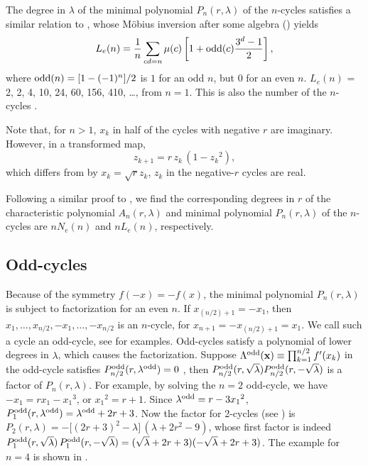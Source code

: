 \documentclass[twocolumn]{revtex4-1}
\begin{document}
The degree in $\lambda$ of
the minimal polynomial $P_n(r, \lambda)$ of the $n$-cycles
satisfies a similar relation to ,
%
whose M\"obius inversion
after some algebra () yields
\begin{equation}
  L_e(n) = \frac{1}{n} \sum_{cd = n} \mu(c)
    \left[
      1 + \mathrm{odd}(c)\frac{3^d-1}{2}
    \right],
\label{eq:cublyndon}
\end{equation}
where $\mathrm{odd}(n) = [1 - (-1)^n]/2$
is $1$ for an odd $n$,
but $0$ for an even $n$.
%
%
$L_e(n)$ = 2, 2, 4, 10, 24, 60, 156, 410, \ldots, from $n = 1$.
%
This is also the number of the $n$-cycles \cite{hao}.



Note that, for $n>1$, $x_k$ in half of the cycles with negative $r$
are imaginary.
However, in a transformed map,
\[
z_{k+1} = r \, z_k \, (1 - {z_k}^2),
\]
which differs from  by $x_k = \sqrt{r} z_k$,
$z_k$ in the negative-$r$ cycles are real.



Following a similar proof to ,
we find the corresponding degrees in $r$
of the characteristic polynomial $A_n(r, \lambda)$
  and minimal polynomial $P_n(r, \lambda)$ of the $n$-cycles
are $n N_e(n)$ and $n L_e(n)$, respectively.


\subsection{\label{sec:oddcycle}Odd-cycles}

Because of the symmetry $f(-x) = -f(x)$,
the minimal polynomial $P_n(r, \lambda)$
is subject to factorization for an even $n$.
%
If $x_{(n/2)+1} = -x_1$,
  then $x_1, \ldots, x_{n/2}, -x_1, \ldots, -x_{n/2}$
  is an $n$-cycle,
  for $x_{n+1} = - x_{(n/2)+1} = x_1$.
We call such a cycle an odd-cycle,
see  for examples.
%
Odd-cycles satisfy a polynomial
  of lower degrees in $\lambda$,
  which causes the factorization.
%
Suppose $\Lambda^{\mathrm{odd}}(\mathbf{x}) \equiv \prod_{k = 1}^{n/2} f'(x_k)$ in the odd-cycle
 satisfies $P_{n/2}^{\mathrm{odd}}(r, \lambda^{\mathrm{odd}}) = 0$
\big[where $\lambda^\odd$ is the value of $\Lambda^\odd(\vx)$,
and $\lambda^\odd = \pm\sqrt \lambda$\,\big],
then $P^{\mathrm{odd}}_{n/2}(r, \sqrt \lambda) P^{\mathrm{odd}}_{n/2}(r, -\sqrt \lambda)$
is a factor of $P_{n}(r, \lambda)$.
%
For example, by solving the $n = 2$ odd-cycle,
  we have $- x_1 = r x_1 - {x_1}^3$, or ${x_1}^2 = r + 1$.
Since $\lambda^{\mathrm{odd}} = r - 3 {x_1}^2$,
$P^{\mathrm{odd}}_1(r, \lambda^{\mathrm{odd}}) = \lambda^{\mathrm{odd}} + 2 r + 3$.
%
Now the factor for 2-cycles (see )
  is
  $P_2(r,\lambda) = -\big[(2r+3)^2 - \lambda\big]\,(\lambda + 2r^2-9)$,
  whose first factor is indeed
  $P^{\mathrm{odd}}_1(r, \sqrt \lambda) \, P^{\mathrm{odd}}_1(r, -\sqrt \lambda)
   = (\sqrt \lambda + 2 r + 3)(-\sqrt \lambda + 2 r + 3)$.
%
The example for $n=4$ is shown in .
\end{document}
